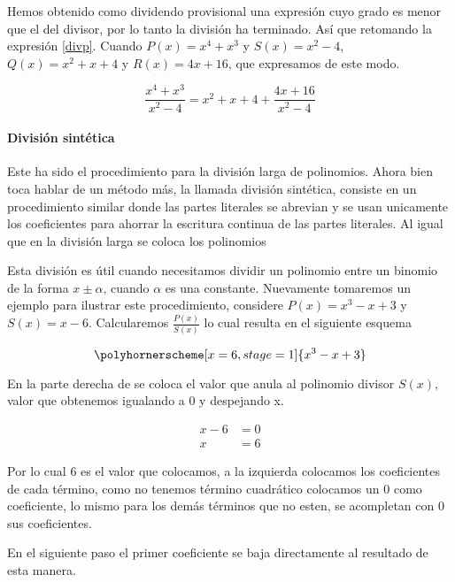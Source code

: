 \documentclass[11pt,letterpaper,oneside]{book}
\numberwithin{equation}{section}
\begin{document}
	\par Hemos obtenido como dividendo provisional una expresión cuyo grado es menor que el del divisor, por lo tanto la división ha terminado. Así que retomando la expresión \eqref{divp}. Cuando $P(x)=x^4+x^3$ y $S(x)=x^2-4$, $ Q(x)= x^2+x+4$ y $R(x)= 4x+16$, que expresamos de este modo.
	
	\begin{equation*}
		\frac{x^4+x^3}{x^2-4} = x^2+x+4 + \frac{4x+16}{x^2-4}
	\end{equation*}

	\paragraph{División sintética} Este ha sido el procedimiento para la división larga de polinomios. Ahora bien toca hablar de un método más, la llamada división sintética, consiste en un procedimiento similar donde las partes literales se abrevian y se usan unicamente los coeficientes para ahorrar la escritura continua de las partes literales. Al igual que en la división larga se coloca los polinomios 
	
	\par Esta división es útil cuando necesitamos dividir un polinomio entre un binomio de la forma $x \pm \alpha$, cuando $\alpha$ es una constante. Nuevamente tomaremos un ejemplo para ilustrar este procedimiento, considere $P(x)=x^3-x+3$ y $S(x)=x-6$. Calcularemos $\frac{P(x)}{S(x)}$ lo cual resulta en el siguiente esquema
	
	\begin{equation*}
	\polyhornerscheme[x=6,stage=1]{x^3-x+3}
	\end{equation*}
	
	\par En la parte derecha de se coloca el valor que anula al polinomio divisor $S(x)$, valor que obtenemos igualando a 0 y despejando x.
	
	\begin{align*}
		x-6&=0  \\
		x&=6
	\end{align*}
	
	\par Por lo cual 6 es el valor que colocamos, a la izquierda colocamos los coeficientes de cada término, como no tenemos término cuadrático colocamos un 0 como coeficiente, lo mismo para los demás términos que no esten, se acompletan con 0 sus coeficientes.
	
	\par En el siguiente paso el primer coeficiente se baja directamente al resultado de esta manera.
	
\end{document}
